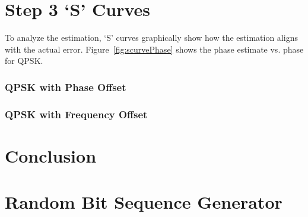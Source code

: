 \documentclass[]{article}
\begin{document}
\newpage
\section{Step 3 `S' Curves}
\label{sec:scurves}
To analyze the estimation, `S' curves graphically show how the estimation aligns with the actual error.  Figure~\ref{fig:scurvePhase} shows the phase estimate vs. phase for QPSK.   


\subsubsection{QPSK with Phase Offset}
\label{sec:s_phase}

\subsubsection{QPSK with Frequency Offset}
\label{sec:s_freq}


\newpage
\section{Conclusion}
\label{sec:conc}

\appendix
\newpage


\newpage
%


\section{Random Bit Sequence Generator}
\label{app:random_bit_generator}

\end{document}
